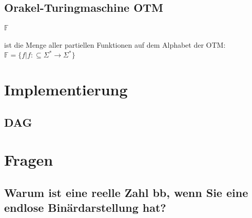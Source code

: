 \documentclass[ngerman]{scrartcl}
\begin{document}
\subsection{Orakel-Turingmaschine OTM}
\paragraph{$ \mathbb{F} $} 
ist die Menge aller partiellen Funktionen auf dem Alphabet der OTM: \\ 
 $ \mathbb{F} = \{ f | f: \subseteq \Sigma^* \rightarrow  \Sigma^* \}$


\section{Implementierung}

\subsection{DAG}





\section{Fragen}
\subsection{Warum ist eine reelle Zahl bb, wenn Sie eine endlose Binärdarstellung hat?}
\end{document}
